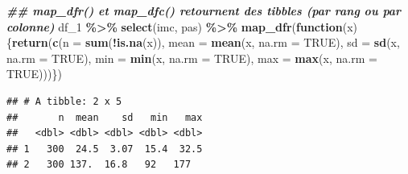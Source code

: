 \documentclass[
]{book}
\newenvironment{Shaded}{\begin{snugshade}}{\end{snugshade}}
\newcommand{\AttributeTok}[1]{\textcolor[rgb]{0.13,0.29,0.53}{#1}}
\newcommand{\ConstantTok}[1]{\textcolor[rgb]{0.56,0.35,0.01}{#1}}
\newcommand{\ControlFlowTok}[1]{\textcolor[rgb]{0.13,0.29,0.53}{\textbf{#1}}}
\newcommand{\DocumentationTok}[1]{\textcolor[rgb]{0.56,0.35,0.01}{\textbf{\textit{#1}}}}
\newcommand{\FunctionTok}[1]{\textcolor[rgb]{0.13,0.29,0.53}{\textbf{#1}}}
\newcommand{\NormalTok}[1]{#1}
\newcommand{\SpecialCharTok}[1]{\textcolor[rgb]{0.81,0.36,0.00}{\textbf{#1}}}
\begin{document}
\begin{Shaded}
\begin{Highlighting}[]
\DocumentationTok{\#\# map\_dfr() et map\_dfc() retournent des tibbles (par rang ou par colonne)}
\NormalTok{df\_1 }\SpecialCharTok{\%\textgreater{}\%}
  \FunctionTok{select}\NormalTok{(imc, pas) }\SpecialCharTok{\%\textgreater{}\%}
  \FunctionTok{map\_dfr}\NormalTok{(}\ControlFlowTok{function}\NormalTok{(x) \{}\FunctionTok{return}\NormalTok{(}\FunctionTok{c}\NormalTok{(}\AttributeTok{n =} \FunctionTok{sum}\NormalTok{(}\SpecialCharTok{!}\FunctionTok{is.na}\NormalTok{(x)),}
                                \AttributeTok{mean =} \FunctionTok{mean}\NormalTok{(x, }\AttributeTok{na.rm =} \ConstantTok{TRUE}\NormalTok{),}
                                \AttributeTok{sd =} \FunctionTok{sd}\NormalTok{(x, }\AttributeTok{na.rm =} \ConstantTok{TRUE}\NormalTok{),}
                                \AttributeTok{min =} \FunctionTok{min}\NormalTok{(x, }\AttributeTok{na.rm =} \ConstantTok{TRUE}\NormalTok{),}
                                \AttributeTok{max =} \FunctionTok{max}\NormalTok{(x, }\AttributeTok{na.rm =} \ConstantTok{TRUE}\NormalTok{)))\})}
\end{Highlighting}
\end{Shaded}

\begin{verbatim}
## # A tibble: 2 x 5
##       n  mean    sd   min   max
##   <dbl> <dbl> <dbl> <dbl> <dbl>
## 1   300  24.5  3.07  15.4  32.5
## 2   300 137.  16.8   92   177
\end{verbatim}
\end{document}
